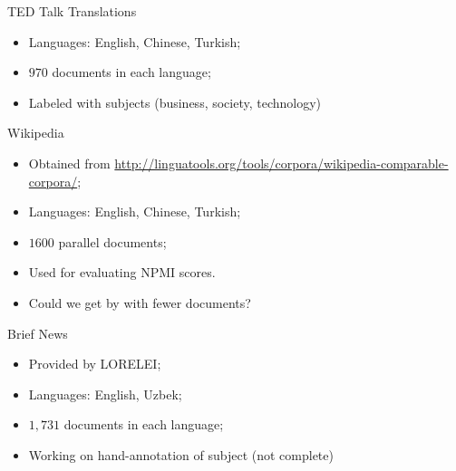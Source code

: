 \documentclass[compress]{beamer}
\begin{document}

	\begin{frame}{TED Talk Translations}
	    \begin{itemize}
	      \item Languages: English, Chinese, Turkish;
	      \item $970$ documents in each language;
	      \item Labeled with subjects (business, society, technology)
	    \end{itemize}
	\end{frame}



	\begin{frame}{Wikipedia}
		\begin{itemize}
			\item Obtained from \url{http://linguatools.org/tools/corpora/wikipedia-comparable-corpora/};
			\item Languages: English, Chinese, Turkish;
			\item $1600$ parallel documents;
			\item Used for evaluating NPMI scores.
\pause
\item Could we get by with fewer documents?
		\end{itemize}
	\end{frame}

	\begin{frame}{Brief News}
		\begin{itemize}
			\item Provided by LORELEI;
			\item Languages: English, Uzbek;
			\item $1,731$ documents in each language;
			\item Working on hand-annotation of subject (not complete)
		\end{itemize}
	\end{frame}
\end{document}
